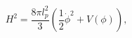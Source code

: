 \begin{equation}
H^{2}=\frac{8\pi l_{p}^{2}}{3}\left( \frac{1}{2}\dot{\phi}^{2}+V\left( \phi
\right) \right) ,  \label{fesl}
\end{equation}

